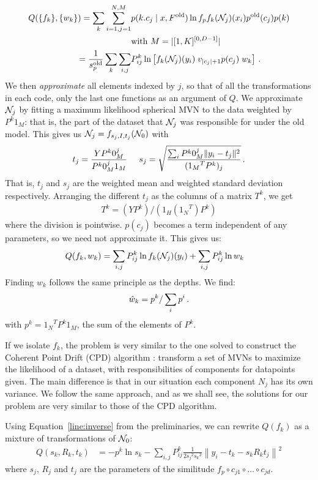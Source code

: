 \documentclass[10pt,a4paper,oneside]{article}
\theoremstyle{definition}
\newcommand{\p}{\mbox{\,.}}
\newcommand{\cN}{{\cal N}}
\theoremstyle{definition}
\begin{document}
\begin{align*}
Q(\{f_k\}, \{w_k\}) = \sum_k \sum_{i=1,j=1}^{N, M} & p(k.c_j \mid x, F^\text{old}) \ln f_p f_k(\cN_{j})(x_i) p^{\text{old}}(c_j) p(k)\\ & \hfill \text{with } M = |[1,K]^{[0, D-1]}|  \\
= \frac{1}{s^\text{old}_p}\sum_k \sum_{i, j} &P^k_{ij} \ln \left[ f_k(\cN_{j})(y_i) \; v_{|c_j|+1} p(c_j) \; w_k \right]\p
\end{align*}
We then \emph{approximate} all elements indexed by $j$, so that of all the transformations in each code, only the last one functions as an argument of $Q$. We approximate $\cN_j$ by fitting a maximum likelihood spherical MVN to the data weighted by $P^k1_M$: that is, the part of the dataset that $\cN_j$ was responsible for under the old model. This gives us $\cN_j = f_{s_j, I, t_j}(\cN_0)$ with
\[
t_j = \frac{YP^k0_M^j}{P^k0_M^j 1_M} \;\;\;\;\; s_j = \sqrt{\frac{\sum_i P^k0_M^j\| y_i - t_j\|^2 }{({1_M}^TP^k)_j}} \p
\]
That is, $t_j$ and $s_j$ are the weighted mean and weighted standard deviation respectively. Arranging the different $t_j$ as the columns of a matrix $T^k$, we get 
\begin{align}
T^k = (YP^k) / (1_H({1_N}^T)P^k) \label{line:tk}
\end{align}
where the division is pointwise. $p(c_j)$ becomes a term independent of any parameters, so we need not approximate it. This gives us:
\begin{align*}
Q(f_k, w_k) &= \sum_{i, j} P^k_{ij} \ln f_k(\cN_j)(y_i) + \sum_{i, j} P^k_{ij} \ln w_k  
\end{align*}
Finding $w_k$ follows the same principle as the depths. We find:
\[
\hat w_k = p^k / \sum_{i} p^i \p
\]
with $p^k = {1_N}^TP^k1_M$, the sum of the elements of $P^k$.

If we isolate $f_k$, the problem is very similar to the one solved to construct the Coherent Point Drift (CPD) algorithm \cite{myronenko2010point}: transform a set of MVNs to maximize the likelihood of a dataset, with responsibilities of components for datapoints given. The main difference is that in our situation each component $N_j$ has its own variance. We follow the same approach, and as we shall see, the solutions for our problem are very similar to those of the CPD algorithm.

Using Equation~\ref{line:inverse} from the preliminaries, we can rewrite $Q(f_k)$ as a mixture of transformations of $\cN_0$:
\begin{align*} 
Q(s_k, R_k, t_k) &= - p^k\ln s_k - \sum_{i, j} P^k_{ij} \frac{1}{2{s_j}^2{s_k}^2} \left\|y_i-t_k - s_k R_k t_j \right\|^2 
\end{align*}
where $s_j$, $R_j$ and $t_j$ are the parameters of the similitude $f_p \circ c_{j1} \circ \ldots \circ c_{jd}$. 
\end{document}
